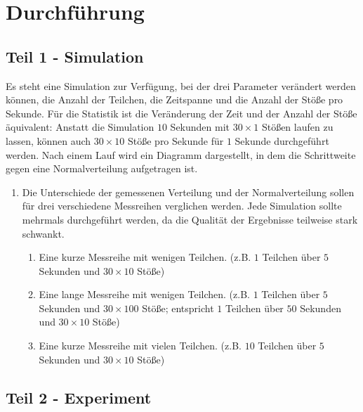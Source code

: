 \section*{Durchführung}

\subsection*{Teil 1 - Simulation}

Es steht eine Simulation zur Verfügung, bei der drei Parameter verändert werden können, die Anzahl der Teilchen, die Zeitspanne und die Anzahl der Stöße pro Sekunde. Für die Statistik ist die Veränderung der Zeit und der Anzahl der Stöße äquivalent: Anstatt die Simulation $10$ Sekunden mit $30\times1$ Stößen laufen zu lassen, können auch $30\times10$ Stöße pro Sekunde für $1$ Sekunde durchgeführt werden. Nach einem Lauf wird ein Diagramm dargestellt, in dem die Schrittweite gegen eine Normalverteilung aufgetragen ist.\\
\begin{enumerate}

    \item Die Unterschiede der gemessenen Verteilung und der Normalverteilung sollen für drei verschiedene Messreihen verglichen werden. Jede Simulation sollte mehrmals durchgeführt werden, da die Qualität der Ergebnisse teilweise stark schwankt.

    \begin{enumerate}

      \item Eine kurze Messreihe mit wenigen Teilchen. (z.B. $1$ Teilchen über $5$ Sekunden und $30\times10$ Stöße)

      \item Eine lange Messreihe mit wenigen Teilchen. (z.B. $1$ Teilchen über $5$ Sekunden und $30\times100$ Stöße; entspricht $1$ Teilchen über $50$ Sekunden und $30\times10$ Stöße)

      \item Eine kurze Messreihe mit vielen Teilchen. (z.B. $10$ Teilchen über $5$ Sekunden und $30\times10$ Stöße)

    \end{enumerate}

\end{enumerate}


\subsection*{Teil 2 - Experiment}

